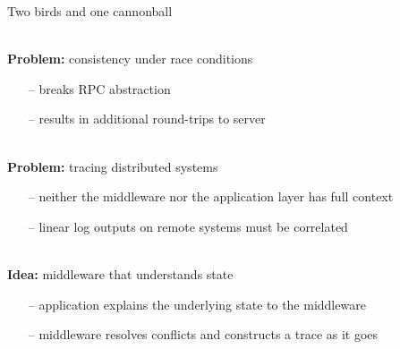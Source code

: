 \documentclass[aspectratio=1610]{beamer}
\begin{document}
\begin{frame}{Two birds and one cannonball}

  \pause

  \begin{alertblock}{\\[-2mm]\hspace{1mm}\textbf{Problem:} consistency under race conditions}
    \begin{itemize}
    \item[--] breaks RPC abstraction
    \item[--] results in additional round-trips to server
    \end{itemize}
  \end{alertblock}

  \pause

  \begin{alertblock}{\\[-2mm]\hspace{1mm}\textbf{Problem:} tracing distributed
      systems}
    \begin{itemize}
    \item[--] neither the middleware nor the application layer has full context
    \item[--] linear log outputs on remote systems must be correlated
    \end{itemize}
  \end{alertblock}

  \vspace{3mm}
  \pause
  \begin{exampleblock}{\\[-2mm]\hspace{1mm}\textbf{Idea:} middleware that
      understands state\vspace{1mm}}
    \begin{itemize}
    \item[--] application explains the underlying state to
      the middleware
    \item[--] middleware resolves conflicts and constructs a trace as
      it goes
    \end{itemize}
  \end{exampleblock}

\end{frame}
\end{document}
